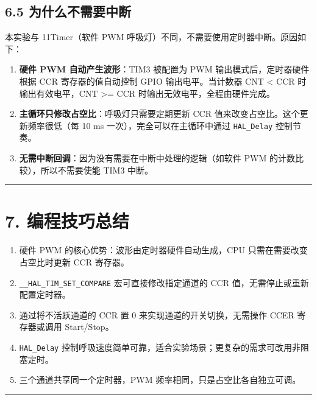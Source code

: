\documentclass[
  chinese,
  UTF8,
  oneside,
  openany]{ctexbook}
\providecommand{\tightlist}{%
  \setlength{\itemsep}{0pt}\setlength{\parskip}{0pt}}
\begin{document}
\subsection{6.5
为什么不需要中断}\label{ux4e3aux4ec0ux4e48ux4e0dux9700ux8981ux4e2dux65ad}

本实验与 11Timer（软件 PWM
呼吸灯）不同，不需要使用定时器中断。原因如下：

\begin{enumerate}
\def\labelenumi{\arabic{enumi}.}
\tightlist
\item
  \textbf{硬件 PWM 自动产生波形}：TIM3 被配置为 PWM
  输出模式后，定时器硬件根据 CCR 寄存器的值自动控制 GPIO
  输出电平。当计数器 CNT \textless{} CCR 时输出有效电平，CNT
  \textgreater= CCR 时输出无效电平，全程由硬件完成。
\item
  \textbf{主循环只修改占空比}：呼吸灯只需要定期更新 CCR
  值来改变占空比。这个更新频率很低（每 10 ms
  一次），完全可以在主循环中通过 \texttt{HAL\_Delay} 控制节奏。
\item
  \textbf{无需中断回调}：因为没有需要在中断中处理的逻辑（如软件 PWM
  的计数比较），所以不需要使能 TIM3 中断。
\end{enumerate}

\begin{center}\rule{0.5\linewidth}{0.5pt}\end{center}

\section{7. 编程技巧总结}\label{ux7f16ux7a0bux6280ux5de7ux603bux7ed3-4}

\begin{enumerate}
\def\labelenumi{\arabic{enumi}.}
\tightlist
\item
  硬件 PWM 的核心优势：波形由定时器硬件自动生成，CPU
  只需在需要改变占空比时更新 CCR 寄存器。
\item
  \texttt{\_\_HAL\_TIM\_SET\_COMPARE} 宏可直接修改指定通道的 CCR
  值，无需停止或重新配置定时器。
\item
  通过将不活跃通道的 CCR 置 0 来实现通道的开关切换，无需操作 CCER
  寄存器或调用 Start/Stop。
\item
  \texttt{HAL\_Delay}
  控制呼吸速度简单可靠，适合实验场景；更复杂的需求可改用非阻塞定时。
\item
  三个通道共享同一个定时器，PWM 频率相同，只是占空比各自独立可调。
\end{enumerate}

\begin{center}\rule{0.5\linewidth}{0.5pt}\end{center}
\end{document}
